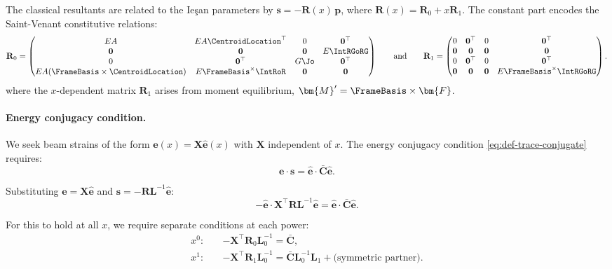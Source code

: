 The classical resultants are related to the Ieşan parameters by 
$\bm{s} = -\mathbf{R}(x)\,\bm{p}$, where $\mathbf{R}(x) = \mathbf{R}_0 + x\mathbf{R}_1$. 
The constant part encodes the Saint-Venant constitutive relations:
\begin{equation}
\mathbf{R}_0 = \begin{pmatrix}
EA & EA\CentroidLocation^\top & 0 & \mathbf{0}^\top \\
\mathbf{0} & \mathbf{0} & \mathbf{0} & E\IntRGoRG \\
0 & \mathbf{0}^\top & G\Jo & \mathbf{0}^\top \\
EA(\FrameBasis \times \CentroidLocation) & E\FrameBasis^\times\IntRoR & \mathbf{0} & \mathbf{0}
\end{pmatrix}
\qquad\text{and}\qquad 
\mathbf{R}_1 = \begin{pmatrix}
0 & \mathbf{0}^\top & 0 & \mathbf{0}^\top \\
\mathbf{0} & \mathbf{0} & \mathbf{0} & \mathbf{0} \\
0 & \mathbf{0}^\top & 0 & \mathbf{0}^\top \\
\mathbf{0} & \mathbf{0} & \mathbf{0} & E\FrameBasis^\times\IntRGoRG
\end{pmatrix}.
\label{eq:R0-matrix}
\end{equation}
%
where the $x$-dependent matrix \(\mathbf{R}_1\) arises from moment equilibrium, $\bm{M}' = \FrameBasis \times \bm{F}$.

\paragraph{Energy conjugacy condition.}

We seek beam strains of the form $\bm{e}(x) = \mathbf{X}\hat{\bm{e}}(x)$ with 
$\mathbf{X}$ independent of $x$. 
The energy conjugacy condition 
\eqref{eq:def-trace-conjugate} requires:
\begin{equation}
\bm{e}\cdot \bm{s} = \hat{\bm{e}}\cdot \bar{\mathbf{C}} \hat{\bm{e}}.
\end{equation}

Substituting $\bm{e} = \mathbf{X}\hat{\bm{e}}$ and $\bm{s} = -\mathbf{R}\mathbf{L}^{-1}\hat{\bm{e}}$:
\begin{equation*}
-\hat{\bm{e}}\cdot \mathbf{X}^\top \mathbf{R} \mathbf{L}^{-1} \hat{\bm{e}} 
= \hat{\bm{e}}\cdot \bar{\mathbf{C}} \hat{\bm{e}}.
\end{equation*}

For this to hold at all $x$, we require separate conditions at each power:
\begin{align}
x^0: \quad & -\mathbf{X}^\top \mathbf{R}_0 \mathbf{L}_0^{-1} = \bar{\mathbf{C}}, 
\label{eq:x0-condition} \\
x^1: \quad & -\mathbf{X}^\top \mathbf{R}_1 \mathbf{L}_0^{-1} = \bar{\mathbf{C}} \mathbf{L}_0^{-1} \mathbf{L}_1 
+ \text{(symmetric partner)}.
\label{eq:x1-condition}
\end{align}

